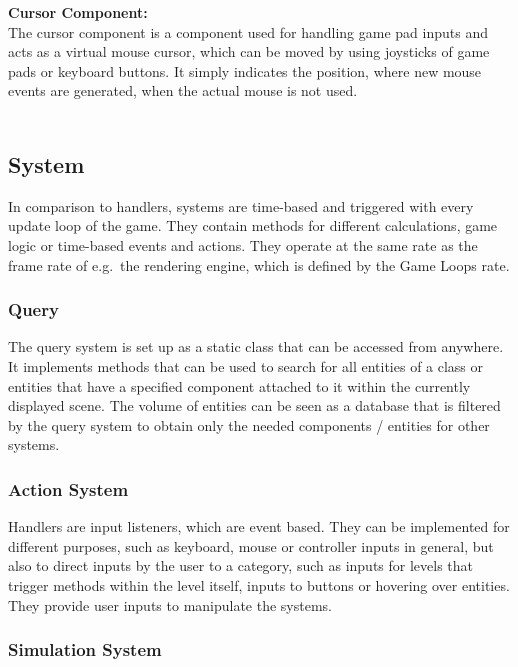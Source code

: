 \textbf{Cursor Component:} \\
The cursor component is a component used for handling game pad inputs and acts as a virtual mouse cursor, which can be moved by using
joysticks of game pads or keyboard buttons.
It simply indicates the position, where new mouse events are generated, when the actual mouse is not used. \\ \\

\subsection{System}\label{subsec:system}
In comparison to handlers, systems are time-based and triggered with every update loop of the game.
They contain methods for different calculations, game logic or time-based events and actions.
They operate at the same rate as the frame rate of e.g.\ the rendering engine, which is defined by the Game Loops rate.

\subsubsection{Query}\label{subsubsec:query2}
The query system is set up as a static class that can be accessed from anywhere.
It implements methods that can be used to search for all entities of a class or entities that have a specified component
attached to it within the currently displayed scene.
The volume of entities can be seen as a database that is filtered by the query system to obtain only the needed components / entities
for other systems. 

\subsubsection{Action System}\label{subsubsec:action-system}
Handlers are input listeners, which are event based.
They can be implemented for different purposes, such as keyboard, mouse or controller inputs in general, but also to direct inputs by the user
to a category, such as inputs for levels that trigger methods within the level itself, inputs to buttons or hovering over entities.
They provide user inputs to manipulate the systems. 
\subsubsection{Simulation System}\label{subsubsec:simulation-system}

